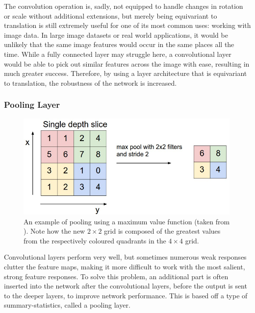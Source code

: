 \documentclass[11pt,a4paper,oldfontcommands]{memoir}
\begin{document}
The convolution operation is, sadly, not equipped to handle changes in rotation or scale without additional extensions, but merely being equivariant to translation is still extremely useful for one of its most common uses: working with image data. In large image datasets or real world applications, it would be unlikely that the same image features would occur in the same places all the time. While a fully connected layer may struggle here, a convolutional layer would be able to pick out similar features across the image with ease, resulting in much greater success. Therefore, by using a layer architecture that is equivariant to translation, the robustness of the network is increased.

\subsubsection{Pooling Layer}

\begin{figure}
    \centering
    \includegraphics[width=30em]{Images/maxpool.jpeg}
    \caption{An example of pooling using a maximum value function (taken from \cite{max_pool_graphic}). Note how the new $2\times2$ grid is composed of the greatest values from the respectively coloured quadrants in the $4\times4$ grid.}
    \label{fig:max_pool_graphic}
\end{figure}

Convolutional layers perform very well, but sometimes numerous weak responses clutter the feature maps, making it more difficult to work with the most salient, strong feature responses. To solve this problem, an additional part is often inserted into the network after the convolutional layers, before the output is sent to the deeper layers, to improve network performance. This is based off a type of summary-statistics, called a pooling layer.
\end{document}
